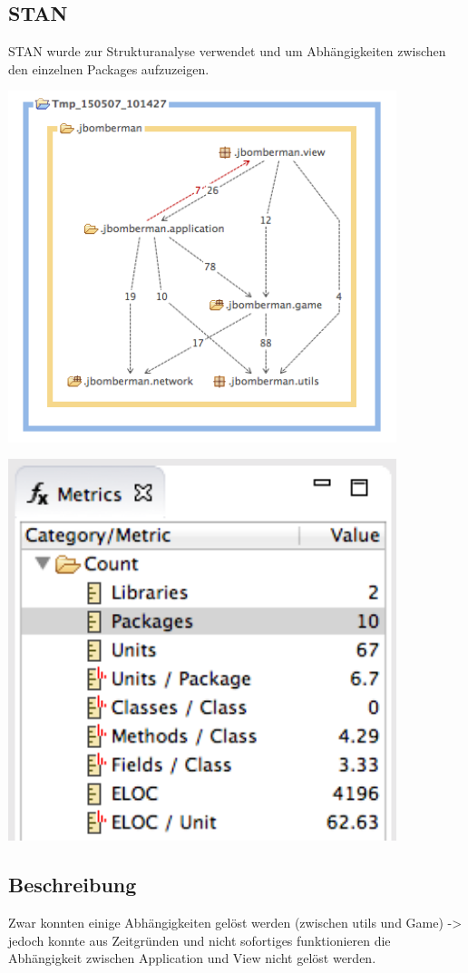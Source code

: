 \documentclass[11pt]{scrartcl}
\begin{document}
\subsection{STAN}
STAN wurde zur Strukturanalyse verwendet und um Abhängigkeiten zwischen den 
einzelnen Packages aufzuzeigen.
\begin{center}
 \includegraphics[width=0.85\textwidth]{stan}
\end{center}
\begin{center}
  \includegraphics[width=0.85\textwidth]{stan-metrics}
\end{center}
\subsection{Beschreibung}
Zwar konnten einige Abhängigkeiten gelöst werden (zwischen utils und Game) -> 
jedoch konnte aus Zeitgründen und nicht sofortiges funktionieren die 
Abhängigkeit zwischen Application und View nicht gelöst werden.
\newpage
\end{document}
